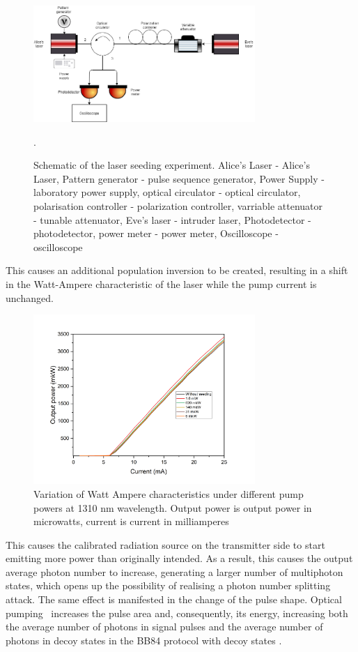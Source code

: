 {\begin{figure}
    \centering
    \includegraphics[width=0.75\textwidth]{images/1310 experiment.png}
    \caption{Schematic of the laser seeding experiment. Alice's Laser - Alice's Laser, Pattern generator - pulse sequence generator, Power Supply - laboratory power supply, optical circulator - optical circulator, polarisation controller - polarization controller, varriable attenuator - tunable attenuator, Eve's laser - intruder laser, Photodetector - photodetector, power meter - power meter, Oscilloscope - oscilloscope}.
\label{fig:exper 1310 syn}
\end{figure}
This causes an additional population inversion to be created, resulting in a shift in the Watt-Ampere characteristic of the laser while the pump current is unchanged.
\begin{figure}
    \centering
    \includegraphics[width=0.75\textwidth]{images/ватт ампер для диссера.png}
    \caption{Variation of Watt Ampere characteristics under different pump powers at 1310 nm wavelength. Output power is output power in microwatts, current is current in milliamperes}
    \label{fig:watt-amp syn}
\end{figure}
This causes the calibrated radiation source on the transmitter side to start emitting more power than originally intended. As a result, this causes the output average photon number to increase, generating a larger number of multiphoton states, which opens up the possibility of realising a photon number splitting attack. The same effect is manifested in the change of the pulse shape. Optical pumping~\cite{svelto2010,okamoto2003,guina2017} increases the pulse area and, consequently, its energy, increasing both the average number of photons in signal pulses and the average number of photons in decoy states in the BB84 protocol with decoy states \cite{liu2020}.

}
